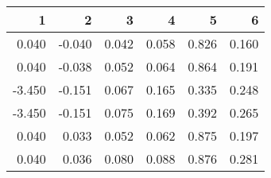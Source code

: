 \begin{table}[ht]
\centering
\begin{tabular}{rrrrrr}
  \hline
1 & 2 & 3 & 4 & 5 & 6 \\ 
  \hline
0.040 & -0.040 & 0.042 & 0.058 & 0.826 & 0.160 \\ 
  0.040 & -0.038 & 0.052 & 0.064 & 0.864 & 0.191 \\ 
  -3.450 & -0.151 & 0.067 & 0.165 & 0.335 & 0.248 \\ 
  -3.450 & -0.151 & 0.075 & 0.169 & 0.392 & 0.265 \\ 
  0.040 & 0.033 & 0.052 & 0.062 & 0.875 & 0.197 \\ 
  0.040 & 0.036 & 0.080 & 0.088 & 0.876 & 0.281 \\ 
   \hline
\end{tabular}
\end{table}
